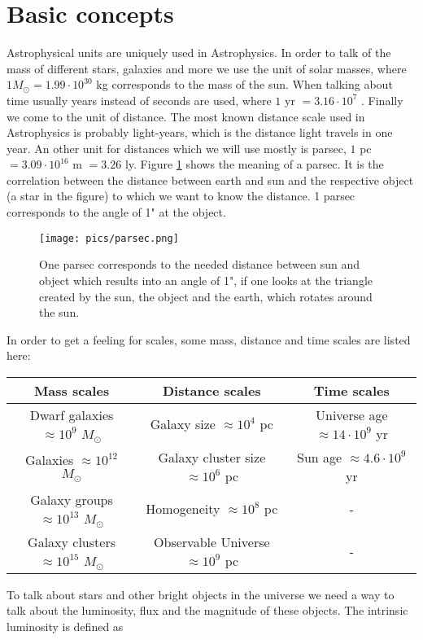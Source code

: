 \section{Basic concepts}
Astrophysical units are uniquely used in Astrophysics. In order to talk of the mass of different stars, galaxies and more we use the unit of solar masses, where $1 M_{\odot} = 1.99 \cdot 10^{30}$ kg corresponds to the mass of the sun. When talking about time usually years instead of seconds are used, where $1$ yr $ = 3.16 \cdot 10^7$ . Finally we come to the unit of distance. The most known distance scale used in Astrophysics is probably light-years, which is the distance light travels in one year. An other unit for distances which we will use mostly is parsec, $1$ pc $ = 3.09 \cdot 10^{16}$ m $ = 3.26$ ly. Figure \ref{fig:parsec} shows the meaning of a parsec. It is the correlation between the distance between earth and sun and the respective object (a star in the figure) to which we want to know the distance. 1 parsec corresponds to the angle of 1" at the object. 
\begin{figure}[H]
	\centering
		\texttt{[image: pics/parsec.png]}
		\caption{One parsec corresponds to the needed distance between sun and object which results into an angle of 1", if one looks at the triangle created by the sun, the object and the earth, which rotates around the sun. \cite{parsec}}
		\label{fig:parsec}
\end{figure}
In order to get a feeling for scales, some mass, distance and time scales are listed here:
\begin{table}[H] 
\label{table:scales}
\centering
\begin{tabular}{|c|c|c|}
\hline
Mass scales & Distance scales & Time scales\\
\hline
Dwarf galaxies $\approx 10^9$ $M_\odot$ & Galaxy size $\approx 10^4$ pc &  Universe age $\approx 14\cdot 10^9$ yr\\
\hline
Galaxies $\approx 10^{12}$ $M_\odot$ & Galaxy cluster size $\approx 10^6$ pc & Sun age $\approx 4.6\cdot 10^9$ yr\\
\hline
Galaxy groups $\approx 10^{13}$ $M_\odot$ & Homogeneity $\approx 10^8$ pc & -\\
\hline
Galaxy clusters $\approx 10^{15}$ $M_\odot$ & Observable Universe $\approx 10^9$ pc & -\\
\hline
\end{tabular}
\end{table}
To talk about stars and other bright objects in the universe we need a way to talk about the luminosity, flux and the magnitude of these objects. The intrinsic luminosity is defined as
